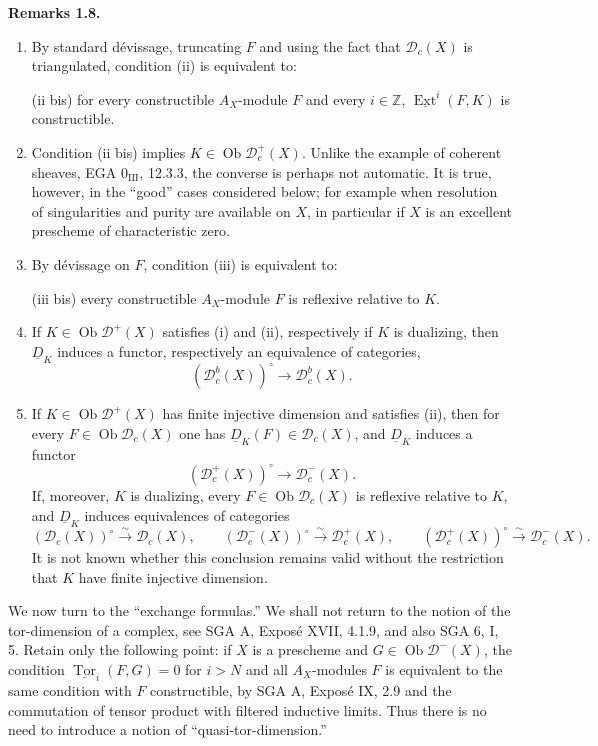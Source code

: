 \documentclass[11pt]{article}
\theoremstyle{plain}
\theoremstyle{definition}
\theoremstyle{remark}
\newenvironment{statement}[1]{\par\medskip\noindent\textbf{#1.}\ }{\par\medskip}
\newcommand{\ZZ}{\mathbb Z}
\newcommand{\D}{\mathcal D}\newcommand{\E}{\mathcal E}\newcommand{\F}{\mathcal F}
\DeclareMathOperator{\Ext}{Ext}
\DeclareMathOperator{\Tor}{Tor}
\DeclareMathOperator{\ob}{Ob}
\begin{document}
\begin{statement}{Remarks 1.8}
\begin{enumerate}[label=\alph*)]
\item By standard dévissage, truncating $F$ and using the fact that $\D_c(X)$ is triangulated, condition (ii) is equivalent to:

(ii bis) for every constructible $A_X$-module $F$ and every $i\in\ZZ$, $\underline{\Ext}^i(F,K)$ is constructible.

\item Condition (ii bis) implies $K\in\ob\D_c^+(X)$. Unlike the example of coherent sheaves, EGA $0_{\mathrm{III}}$, 12.3.3, the converse is perhaps not automatic. It is true, however, in the ``good'' cases considered below; for example when resolution of singularities and purity are available on $X$, in particular if $X$ is an excellent prescheme of characteristic zero.

\item By dévissage on $F$, condition (iii) is equivalent to:

(iii bis) every constructible $A_X$-module $F$ is reflexive relative to $K$.

\item If $K\in\ob\D^+(X)$ satisfies (i) and (ii), respectively if $K$ is dualizing, then $\underline D_K$ induces a functor, respectively an equivalence of categories,
\[
   (\D_c^b(X))^\circ\longrightarrow\D_c^b(X).
\]

\item If $K\in\ob\D^+(X)$ has finite injective dimension and satisfies (ii), then for every $F\in\ob\D_c(X)$ one has $\underline D_K(F)\in\D_c(X)$, and $\underline D_K$ induces a functor
\[
   (\D_c^+(X))^\circ\longrightarrow\D_c^-(X).
\]
If, moreover, $K$ is dualizing, every $F\in\ob\D_c(X)$ is reflexive relative to $K$, and $\underline D_K$ induces equivalences of categories
\[
   (\D_c(X))^\circ\xrightarrow{\sim}\D_c(X),\qquad
   (\D_c^-(X))^\circ\xrightarrow{\sim}\D_c^+(X),\qquad
   (\D_c^+(X))^\circ\xrightarrow{\sim}\D_c^-(X).
\]
It is not known whether this conclusion remains valid without the restriction that $K$ have finite injective dimension.
\end{enumerate}
\end{statement}

We now turn to the ``exchange formulas.'' We shall not return to the notion of the tor-dimension of a complex, see SGA A, Exposé XVII, 4.1.9, and also SGA 6, I, 5. Retain only the following point: if $X$ is a prescheme and $G\in\ob\D^-(X)$, the condition $\underline{\Tor}_i(F,G)=0$ for $i>N$ and all $A_X$-modules $F$ is equivalent to the same condition with $F$ constructible, by SGA A, Exposé IX, 2.9 and the commutation of tensor product with filtered inductive limits. Thus there is no need to introduce a notion of ``quasi-tor-dimension.''
\end{document}
